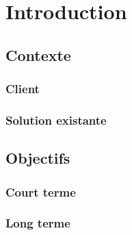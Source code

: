 \section{Introduction}
\subsection{Contexte}
\subsubsection{Client}
\subsubsection{Solution existante}

\subsection{Objectifs}
\subsubsection{Court terme}
\subsubsection{Long terme}